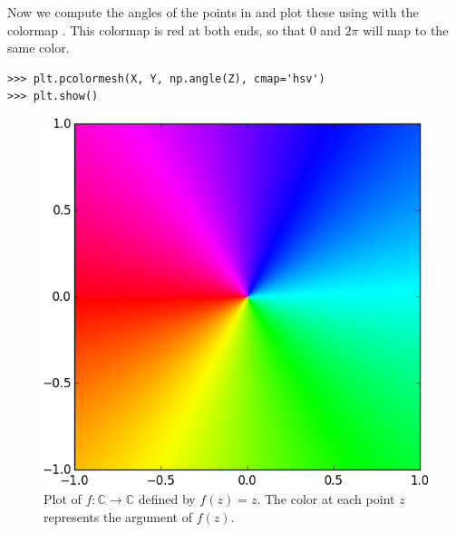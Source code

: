 Now we compute the angles of the points in  and plot these using  with the colormap . 
This colormap is red at both ends, so that $0$ and $2 \pi$ will map to the same color.

\begin{lstlisting}
>>> plt.pcolormesh(X, Y, np.angle(Z), cmap='hsv')
>>> plt.show()
\end{lstlisting}


\begin{figure}
\includegraphics[width=.7\textwidth]{Identity.png}
\caption{Plot of $f: \mathbb{C} \rightarrow \mathbb{C}$ defined by $f(z)=z$. 
The color at each point $z$ represents the argument of $f(z)$.}
\label{fig:identity}
\end{figure}





